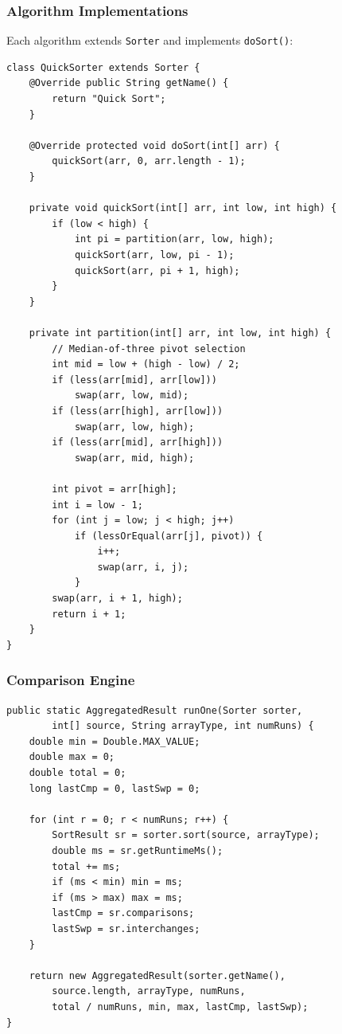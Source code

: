 \documentclass[12pt,a4paper]{article}
\begin{document}
\subsubsection{Algorithm Implementations}

Each algorithm extends \texttt{Sorter} and implements \texttt{doSort()}:

\begin{lstlisting}[caption={Quick Sort Implementation}]
class QuickSorter extends Sorter {
    @Override public String getName() { 
        return "Quick Sort"; 
    }
    
    @Override protected void doSort(int[] arr) { 
        quickSort(arr, 0, arr.length - 1); 
    }
    
    private void quickSort(int[] arr, int low, int high) {
        if (low < high) {
            int pi = partition(arr, low, high);
            quickSort(arr, low, pi - 1);
            quickSort(arr, pi + 1, high);
        }
    }
    
    private int partition(int[] arr, int low, int high) {
        // Median-of-three pivot selection
        int mid = low + (high - low) / 2;
        if (less(arr[mid], arr[low]))  
            swap(arr, low, mid);
        if (less(arr[high], arr[low])) 
            swap(arr, low, high);
        if (less(arr[mid], arr[high])) 
            swap(arr, mid, high);
        
        int pivot = arr[high];
        int i = low - 1;
        for (int j = low; j < high; j++)
            if (lessOrEqual(arr[j], pivot)) { 
                i++; 
                swap(arr, i, j); 
            }
        swap(arr, i + 1, high);
        return i + 1;
    }
}
\end{lstlisting}

\subsubsection{Comparison Engine}

\begin{lstlisting}[caption={Multi-Run Aggregation}]
public static AggregatedResult runOne(Sorter sorter, 
        int[] source, String arrayType, int numRuns) {
    double min = Double.MAX_VALUE;
    double max = 0;
    double total = 0;
    long lastCmp = 0, lastSwp = 0;
    
    for (int r = 0; r < numRuns; r++) {
        SortResult sr = sorter.sort(source, arrayType);
        double ms = sr.getRuntimeMs();
        total += ms;
        if (ms < min) min = ms;
        if (ms > max) max = ms;
        lastCmp = sr.comparisons;
        lastSwp = sr.interchanges;
    }
    
    return new AggregatedResult(sorter.getName(), 
        source.length, arrayType, numRuns, 
        total / numRuns, min, max, lastCmp, lastSwp);
}
\end{lstlisting}
\end{document}
